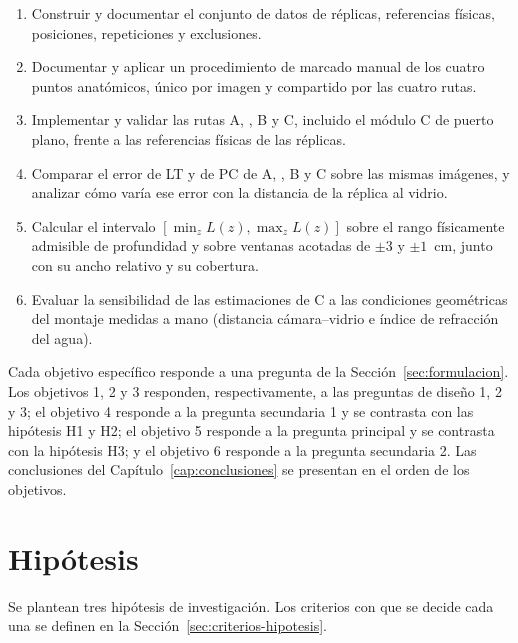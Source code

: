 \begin{enumerate}
  \item Construir y documentar el conjunto de datos de réplicas, referencias físicas, posiciones, repeticiones y exclusiones.
  \item Documentar y aplicar un procedimiento de marcado manual de los cuatro puntos anatómicos, único por imagen y compartido por las cuatro rutas.
  \item Implementar y validar las rutas A, \Aprime, B y C, incluido el módulo C de puerto plano, frente a las referencias físicas de las réplicas.
  \item Comparar el error de LT y de PC de A, \Aprime, B y C sobre las mismas imágenes, y analizar cómo varía ese error con la distancia de la réplica al vidrio.
  \item Calcular el intervalo $[\min_z L(z), \max_z L(z)]$ sobre el rango físicamente admisible de profundidad y sobre ventanas acotadas de $\pm 3$ y $\pm 1$~cm, junto con su ancho relativo y su cobertura.
  \item Evaluar la sensibilidad de las estimaciones de C a las condiciones geométricas del montaje medidas a mano (distancia cámara--vidrio e índice de refracción del agua).
\end{enumerate}

Cada objetivo específico responde a una pregunta de la Sección~\ref{sec:formulacion}. Los objetivos 1, 2 y 3 responden, respectivamente, a las preguntas de diseño 1, 2 y 3; el objetivo 4 responde a la pregunta secundaria 1 y se contrasta con las hipótesis H1 y H2; el objetivo 5 responde a la pregunta principal y se contrasta con la hipótesis H3; y el objetivo 6 responde a la pregunta secundaria 2. Las conclusiones del Capítulo~\ref{cap:conclusiones} se presentan en el orden de los objetivos.

\section{Hipótesis}
\label{sec:hipotesis}

Se plantean tres hipótesis de investigación. Los criterios con que se decide cada una se definen en la Sección~\ref{sec:criterios-hipotesis}.

